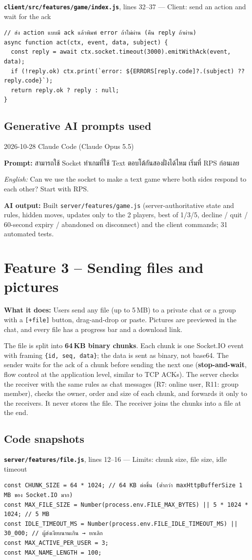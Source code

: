 \documentclass[11pt,a4paper]{article}
\newcommand{\code}[1]{\texttt{#1}}
\newcommand{\req}[1]{\begin{tcolorbox}[colback=accent!6,colframe=accent!60,boxrule=0.5pt,left=4pt,right=4pt,top=2pt,bottom=2pt]\textbf{What it does:} #1\end{tcolorbox}}
\newcommand{\snap}[3]{\par\medskip\textbf{\code{#1}}, lines #2 --- #3}
\newcommand{\promptbox}[4]{%
\begin{tcolorbox}[colback=codebg,colframe=gray!50,boxrule=0.4pt,left=4pt,right=4pt,top=2pt,bottom=2pt]
{\small #1 \quad Claude Code (Claude Opus 5.5)}\par
\textbf{Prompt:} #2\par
\textit{English:} #3\par
\textbf{AI output:} #4
\end{tcolorbox}}
\begin{document}
\snap{client/src/features/game/index.js}{32--37}{Client: send an action and wait for the ack}
\begin{Verbatim}[firstnumber=32]
// ส่ง action แบบมี ack แล้วพิมพ์ error ถ้าไม่ผ่าน (คืน reply ถ้าผ่าน)
async function act(ctx, event, data, subject) {
  const reply = await ctx.socket.timeout(3000).emitWithAck(event, data);
  if (!reply.ok) ctx.print(`error: ${ERRORS[reply.code]?.(subject) ?? reply.code}`);
  return reply.ok ? reply : null;
}
\end{Verbatim}

\subsection*{Generative AI prompts used}
\promptbox{2026-10-28}{สามารถใช้ Socket ทำเกมที่ใช้ Text ตอบโต้กันสองฝั่งได้ไหม \newline เริ่มที่ RPS ก่อนเลย}{Can we use the socket to make a text game where both sides respond to each other? Start with RPS.}{Built \code{server/features/game.js} (server-authoritative state and rules, hidden moves, updates only to the 2 players, best of 1/3/5, decline / quit / 60-second expiry / abandoned on disconnect) and the client commands; 31 automated tests.}

\clearpage
\section{Feature 3 -- Sending files and pictures}
\req{Users send any file (up to 5\,MB) to a private chat or a group with a \code{[+file]}
button, drag-and-drop or paste. Pictures are previewed in the chat, and every file has a progress bar and a
download link.}

The file is split into \textbf{64\,KB binary chunks}. Each chunk is one Socket.IO event with
framing \code{\{id, seq, data\}}; the data is sent as binary, not base64. The sender waits for the ack of a
chunk before sending the next one (\textbf{stop-and-wait}, flow control at the application level, similar to
TCP ACKs). The server checks the receiver with the same rules as chat messages (R7: online user, R11: group
member), checks the owner, order and size of each chunk, and forwards it only to the receivers. It never
stores the file. The receiver joins the chunks into a file at the end.

\subsection*{Code snapshots}
\snap{server/features/file.js}{12--16}{Limits: chunk size, file size, idle timeout}
\begin{Verbatim}[firstnumber=12]
const CHUNK_SIZE = 64 * 1024; // 64 KB ต่อชิ้น (ต่ำกว่า maxHttpBufferSize 1 MB ของ Socket.IO มาก)
const MAX_FILE_SIZE = Number(process.env.FILE_MAX_BYTES) || 5 * 1024 * 1024; // 5 MB
const IDLE_TIMEOUT_MS = Number(process.env.FILE_IDLE_TIMEOUT_MS) || 30_000; // ผู้ส่งเงียบนานเกิน → ยกเลิก
const MAX_ACTIVE_PER_USER = 3;
const MAX_NAME_LENGTH = 100;
\end{Verbatim}
\end{document}
